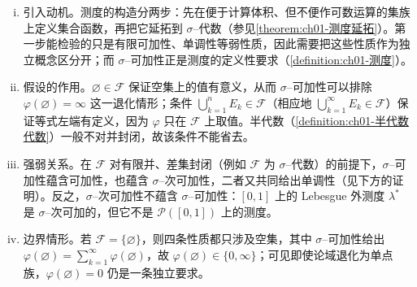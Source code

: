 \documentclass[../../main.tex]{subfiles}%
\begin{document}
\begin{remark}\label{remark:ch01-集合函数性质}
\begin{enumerate}[(i)]
\item 引入动机。测度的构造分两步：先在便于计算体积、但不便作可数运算的集族上定义集合函数，再把它延拓到 $\sigma$--代数（参见\cref{theorem:ch01-测度延拓}）。第一步能检验的只是有限可加性、单调性等弱性质，因此需要把这些性质作为独立概念区分开；而 $\sigma$--可加性正是测度的定义性要求（\cref{definition:ch01-测度}）。
\item 假设的作用。$\varnothing \in\mathcal{F}$ 保证空集上的值有意义，从而 $\sigma$--可加性可以排除 $\varphi(\varnothing )=\infty$ 这一退化情形；条件 $\bigcup_{k=1}^nE_k\in\mathcal{F}$（相应地 $\bigcup_{k=1}^\infty E_k\in\mathcal{F}$）保证等式左端有定义，因为 $\varphi$ 只在 $\mathcal{F}$ 上取值。半代数（\cref{definition:ch01-半代数代数}）一般不对并封闭，故该条件不能省去。
\item 强弱关系。在 $\mathcal{F}$ 对有限并、差集封闭（例如 $\mathcal{F}$ 为 $\sigma$--代数）的前提下，$\sigma$--可加性蕴含可加性，也蕴含 $\sigma$--次可加性，二者又共同给出单调性（见下方的证明）。反之，$\sigma$--次可加性不蕴含 $\sigma$--可加性：$[0,1]$ 上的 Lebesgue 外测度 $\lambda^*$ 是 $\sigma$--次可加的，但它不是 $\mathcal{P}([0,1])$ 上的测度。
\item 边界情形。若 $\mathcal{F}=\{\varnothing \}$，则四条性质都只涉及空集，其中 $\sigma$--可加性给出 $\varphi(\varnothing )=\sum_{k=1}^\infty\varphi(\varnothing )$，故 $\varphi(\varnothing )\in\{0,\infty\}$；可见即使论域退化为单点族，$\varphi(\varnothing )=0$ 仍是一条独立要求。
\end{enumerate}
\end{remark}
\end{document}
